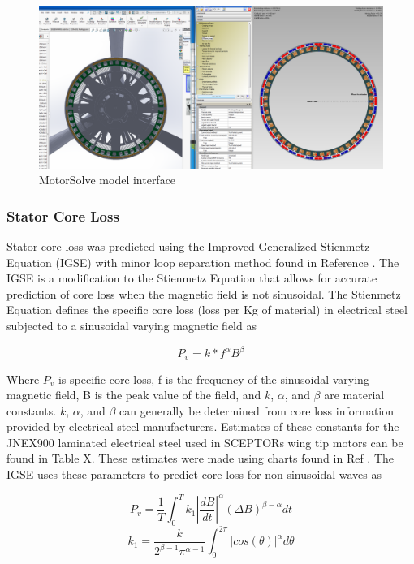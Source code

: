 \documentclass[]{aiaa-tc}%
\begin{document}
\begin{figure}[!htb]%
	\centering
	\includegraphics[width=1.0\textwidth]{figures/motorSolve.png}
	\caption{MotorSolve model interface}
	\label{fig:motorSolve}
\end{figure}

\subsubsection{Stator Core Loss}
Stator core loss was predicted using the Improved Generalized Stienmetz Equation (IGSE) with minor loop separation method found in Reference \cite{CoreLoss}. The IGSE is a modification to the Stienmetz Equation that allows for accurate prediction of core loss when the magnetic field is not sinusoidal. The Stienmetz Equation defines the specific core loss (loss per Kg of material) in electrical steel subjected to a sinusoidal varying magnetic field as

\begin{equation}
P_{v} = k*f^{\alpha}B^{\beta}
\label{eq:CoreLoss}
\end{equation}

Where $P_v$ is specific core loss, f is the frequency of the sinusoidal varying magnetic field, B is the peak value of the field, 
and $k$, $\alpha$, and $\beta$ are material constants. $k$, $\alpha$, and $\beta$  
can generally be determined from core loss information provided by electrical steel manufacturers. 
Estimates of these constants for the JNEX900 laminated electrical steel used in SCEPTORs wing tip motors can be found in Table X. 
These estimates were made using charts found in Ref \cite{JFE}. The IGSE uses these parameters to predict core loss for non-sinusoidal waves as


\begin{equation}
P_{v} = \frac{1}{T}\int_{0}^{T}k_{1}|\frac{dB}{dt}|^{\alpha}(\Delta B)^{\beta-\alpha}dt
\label{eq:CoreLoss2}
\end{equation}
\begin{equation}
k_{1} = \frac{k}{2^{\beta-1}\pi^{\alpha-1}}\int_{0}^{2\pi}|cos(\theta)|^{\alpha}d\theta
\label{eq:CoreLoss2b}
\end{equation}
\end{document}
